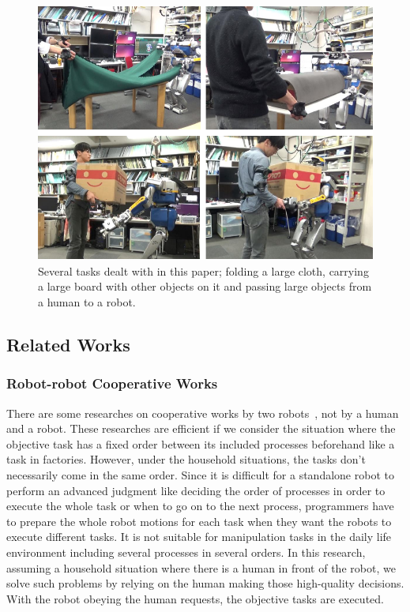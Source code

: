 \begin{figure}[htbp]
 \begin{center}
  \includegraphics[width=1.00\columnwidth]{figs/several_tasks2}
  \caption{Several tasks dealt with in this paper; folding a large cloth, carrying a large board with other objects on it and passing large objects from a human to a robot.}
  \label{figure:overview}
 \end{center}
\end{figure}

\subsection{Related Works}

\subsubsection{Robot-robot Cooperative Works}
There are some researches on cooperative works by two robots~\cite{robot-robot1}\cite{robot-robot2}\cite{robot_robot_assmble}, not by a human and a robot. These researches are efficient if we consider the situation where the objective task has a fixed order between its included processes beforehand like a task in factories. However, under the household situations, the tasks don't necessarily come in the same order. Since it is difficult for a standalone robot to perform an advanced judgment like deciding the order of processes in order to execute the whole task or when to go on to the next process, programmers have to prepare the whole robot motions for each task when they want the robots to execute different tasks. It is not suitable for manipulation tasks in the daily life environment including several processes in several orders. In this research, assuming a household situation where there is a human in front of the robot, we solve such problems by relying on the human making those high-quality decisions. With the robot obeying the human requests, the objective tasks are executed.

